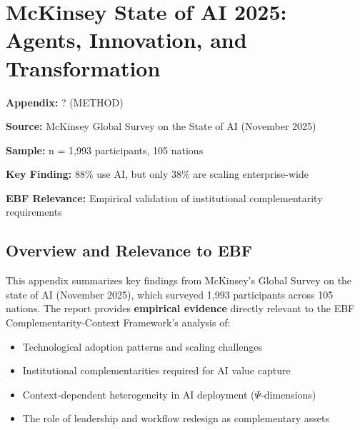
\section{McKinsey State of AI 2025: Agents, Innovation, and Transformation}
\label{appendix:VVV1_mckinsey_ai_2025}

\begin{tcolorbox}[colback=blue!5!white, colframe=blue!75!black,
    title=Quick Reference: VVV1 McKinsey Report]
\textbf{Appendix:} ? (METHOD)


\textbf{Source:} McKinsey Global Survey on the State of AI (November 2025)

\textbf{Sample:} n = 1,993 participants, 105 nations

\textbf{Key Finding:} 88\% use AI, but only 38\% are scaling enterprise-wide

\textbf{EBF Relevance:} Empirical validation of institutional complementarity requirements

\end{tcolorbox}


\subsection{Overview and Relevance to EBF}

This appendix summarizes key findings from McKinsey's Global Survey on the state of AI (November 2025), which surveyed 1,993 participants across 105 nations. The report provides \textbf{empirical evidence} directly relevant to the EBF Complementarity-Context Framework's analysis of:

\begin{itemize}
\item Technological adoption patterns and scaling challenges
\item Institutional complementarities required for AI value capture
\item Context-dependent heterogeneity in AI deployment ($\Psi$-dimensions)
\item The role of leadership and workflow redesign as complementary assets
\end{itemize}


